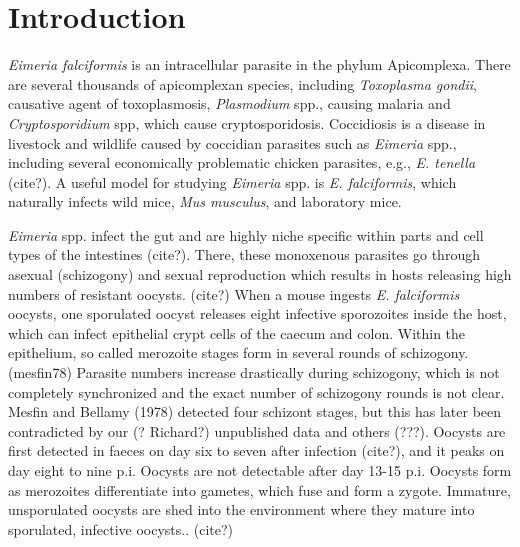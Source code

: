 \documentclass{bmcart}
\begin{document}



\section*{Introduction}
\textit{Eimeria falciformis} is an intracellular parasite in the phylum Apicomplexa. There are several thousands of apicomplexan species, including \textit{Toxoplasma gondii}, causative agent of toxoplasmosis, \textit{Plasmodium} spp., causing malaria and \textit{Cryptosporidium} spp, which cause cryptosporidosis. Coccidiosis is a disease in livestock and wildlife caused by coccidian parasites such as \textit{Eimeria} spp., including several economically problematic chicken parasites, e.g., \textit{E. tenella} (cite?). A useful model for studying \textit{Eimeria} spp. is \textit{E. falciformis}, which naturally infects wild mice, \textit{Mus musculus}, and laboratory mice. 

\textit{Eimeria} spp. infect the gut and are highly niche specific within parts and cell types of the intestines (cite?). There, these monoxenous parasites go through asexual (schizogony) and sexual reproduction which results in hosts releasing high numbers of resistant oocysts. (cite?) When a mouse ingests \textit{E. falciformis} oocysts, one sporulated oocyst releases eight infective sporozoites inside the host, which can infect epithelial crypt cells of the caecum and colon. Within the epithelium, so called merozoite stages form in several rounds of schizogony. (mesfin78) Parasite numbers increase drastically during schizogony, which is not completely synchronized and the exact number of schizogony rounds is not clear. Mesfin and Bellamy (1978) detected four schizont stages, but this has later been contradicted by our (? Richard?) unpublished data and others (???). Oocysts are first detected in faeces on day six to seven after infection (cite?), and it peaks on day eight to nine p.i. Oocysts are not detectable after day 13-15 p.i. Oocysts form as merozoites differentiate into gametes, which fuse and form a zygote. Immature, unsporulated oocysts are shed into the environment where they mature into sporulated, infective oocysts.. (cite?)
\end{document}
